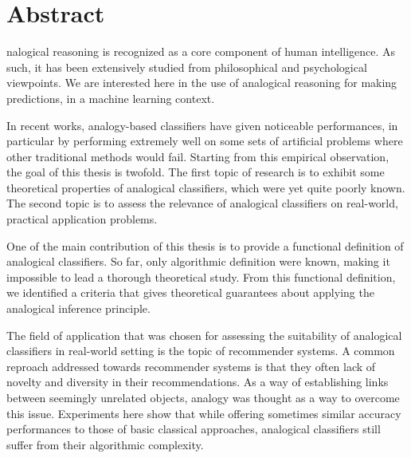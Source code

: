 \chapter*{Abstract}

nalogical reasoning is recognized as a core component of human intelligence.
As such, it has been extensively studied from philosophical and psychological
viewpoints. We are interested here in the use of analogical reasoning for
making predictions, in a machine learning context.

In recent works, analogy-based classifiers have given noticeable performances,
in particular by performing extremely well on some sets of artificial problems
where other traditional methods would fail. Starting from this empirical
observation, the goal of this thesis is twofold. The first topic of research is
to exhibit some theoretical properties of analogical classifiers, which were
yet quite poorly known. The second topic is to assess the relevance of
analogical classifiers on real-world, practical application problems.

One of the main contribution of this thesis is to provide a functional
definition of analogical classifiers. So far, only algorithmic definition were
known, making it impossible to lead a thorough theoretical study. From this
functional definition, we identified a criteria that gives theoretical
guarantees about applying the analogical inference principle.

The field of application that was chosen for assessing the suitability of
analogical classifiers in real-world setting is the topic of recommender
systems. A common reproach addressed towards recommender systems is that they
often lack of novelty and diversity in their recommendations. As a way of
establishing links between seemingly unrelated objects, analogy was thought as
a way to overcome this issue. Experiments here show that while offering
sometimes similar accuracy performances to those of basic classical approaches,
analogical classifiers still suffer from their algorithmic complexity.
